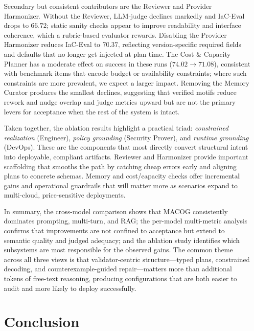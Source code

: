 \documentclass[manuscript,screen,nonacm]{acmart}
\begin{document}
Secondary but consistent contributors are the Reviewer and Provider Harmonizer. Without the Reviewer, LLM-judge declines markedly and IaC-Eval drops to \(66.72\); static sanity checks appear to improve readability and interface coherence, which a rubric-based evaluator rewards. Disabling the Provider Harmonizer reduces IaC-Eval to \(70.37\), reflecting version-specific required fields and defaults that no longer get injected at plan time. The Cost \& Capacity Planner has a moderate effect on success in these runs (\(74.02 \rightarrow 71.08\)), consistent with benchmark items that encode budget or availability constraints; where such constraints are more prevalent, we expect a larger impact. Removing the Memory Curator produces the smallest declines, suggesting that verified motifs reduce rework and nudge overlap and judge metrics upward but are not the primary levers for acceptance when the rest of the system is intact.

Taken together, the ablation results highlight a practical triad: \emph{constrained realization} (Engineer), \emph{policy grounding} (Security Prover), and \emph{runtime grounding} (DevOps). These are the components that most directly convert structural intent into deployable, compliant artifacts. Reviewer and Harmonizer provide important scaffolding that smooths the path by catching cheap errors early and aligning plans to concrete schemas. Memory and cost/capacity checks offer incremental gains and operational guardrails that will matter more as scenarios expand to multi-cloud, price-sensitive deployments.

In summary, the cross-model comparison shows that MACOG consistently dominates prompting, multi-turn, and RAG; the per-model multi-metric analysis confirms that improvements are not confined to acceptance but extend to semantic quality and judged adequacy; and the ablation study identifies which subsystems are most responsible for the observed gains. The common theme across all three views is that validator-centric structure—typed plans, constrained decoding, and counterexample-guided repair—matters more than additional tokens of free-text reasoning, producing configurations that are both easier to audit and more likely to deploy successfully.


\section{Conclusion}
\end{document}
